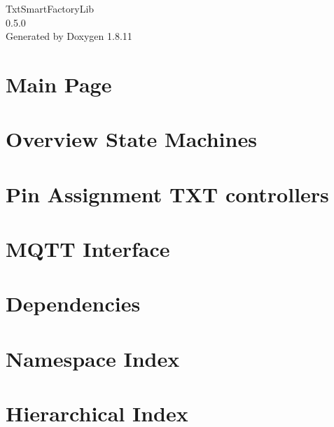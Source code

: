 \documentclass[twoside]{book}
\newcommand{\+}{\discretionary{\mbox{\scriptsize$\hookleftarrow$}}{}{}}
\newcommand{\clearemptydoublepage}{%
  \newpage{\pagestyle{empty}\cleardoublepage}%
}
\begin{document}
\hypersetup{pageanchor=false,
             bookmarksnumbered=true,
             pdfencoding=unicode
            }
\begin{titlepage}
\vspace*{7cm}
\begin{center}%
{\Large Txt\+Smart\+Factory\+Lib \\[1ex]\large 0.\+5.\+0 }\\
\vspace*{1cm}
{\large Generated by Doxygen 1.8.11}\\
\end{center}
\end{titlepage}
\clearemptydoublepage
\tableofcontents
\clearemptydoublepage
{}
\hypersetup{pageanchor=true}

\chapter{Main Page}
\label{index}\hypertarget{index}{}
\chapter{Overview State Machines}
\label{Overview State Machines}
\hypertarget{Overview State Machines}{}

\chapter{Pin Assignment T\+XT controllers}
\label{md_PinAssignmentTXT}
\hypertarget{md_PinAssignmentTXT}{}

\chapter{M\+Q\+TT Interface}
\label{md_MqttInterface}
\hypertarget{md_MqttInterface}{}

\chapter{Dependencies}
\label{md_Dependencies}
\hypertarget{md_Dependencies}{}

\chapter{Namespace Index}

\chapter{Hierarchical Index}

\end{document}
